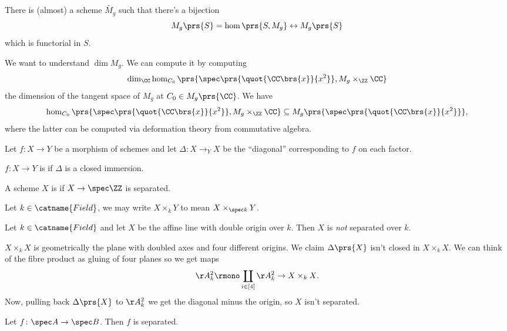 \documentclass[10pt,a4paper,twoside,openany,hidelinks]{book}
\begin{document}
\begin{fact}
There is (almost) a scheme $\widetilde{M_g}$ such that there's a bijection
$$M_g\prs{S} = \hom\prs{S, M_g} \leftrightarrow M_g\prs{S}$$
which is functorial in $S$.
\end{fact}

\begin{remark}
We want to understand $\dim M_g$. We can compute it by computing $$\dim_{\CC} \hom_{C_0}\prs{\spec\prs{\quot{\CC\brs{x}}{x^2}}, M_g \times_{\ZZ} \CC}$$
the dimension of the tangent space of $M_g$ at $C_0 \in M_g\prs{\CC}$.
We have
$$\hom_{C_0}\prs{\spec\prs{\quot{\CC\brs{x}}{x^2}}, M_g \times_{\ZZ} \CC} \subseteq M_g\prs{\spec\prs{\quot{\CC\brs{x}}{x^2}}} \text{,}$$
where the latter can be computed via deformation theory from commutative algebra.
\end{remark}


Let $f \colon X \to Y$ be a morphism of schemes and let $\Delta \colon X \to_Y X$ be the ``diagonal'' corresponding to $f$ on each factor.

\begin{definition}
$f \colon X \to Y$ is  if $\Delta$ is a closed immersion.
\end{definition}

\begin{definition}
A scheme $X$ is  if $X \to \spec \ZZ$ is separated.
\end{definition}

\begin{notation}
Let $k \in \catname{Field}$, we may write $X \times_k Y$ to mean $X \times_{\spec k} Y$.
\end{notation}

\begin{example}
Let $k \in \catname{Field}$ and let $X$ be the affine line with double origin over $k$.
Then $X$ is \emph{not} separated over $k$.

$X \times_k X$ is geometrically the plane with doubled axes and four different origins.
We claim $\Delta\prs{X}$ isn't closed in $X \times_k X$. We can think of the fibre product as gluing of four planes so we get maps
$$\AA_k^2 \rmono \coprod_{i \in [4]} \AA_k^2 \to X \times_k X \text{.}$$
Now, pulling back $\Delta\prs{X}$ to $\AA_k^2$ we get the diagonal minus the origin, so $X$ isn't separated.
\end{example}

\begin{proposition}
Let $f \colon \spec A \to \spec B$. Then $f$ is separated.
\end{proposition}
\end{document}
